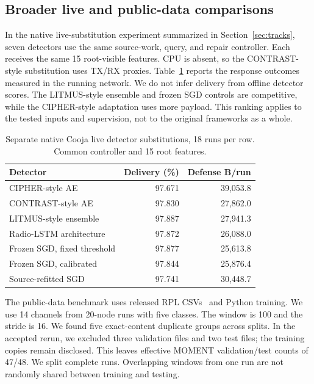 \documentclass[journal]{IEEEtran}
\begin{document}
\subsection{Broader live and public-data comparisons}
In the native live-substitution experiment summarized in Section~\ref{sec:tracks}, seven detectors use the same source-work, query, and repair controller. Each receives the same 15 root-visible features. CPU is absent, so the CONTRAST-style substitution uses TX/RX proxies. Table~\ref{tab:live} reports the response outcomes measured in the running network. We do not infer delivery from offline detector scores. The LITMUS-style ensemble and frozen SGD controls are competitive, while the CIPHER-style adaptation uses more payload. This ranking applies to the tested inputs and supervision, not to the original frameworks as a whole.

\begin{table}[t]\caption{Separate native Cooja live detector substitutions, 18 runs per row. Common controller and 15 root features.}
\label{tab:live}\centering\small
\begin{tabular}{lrr}\toprule Detector & Delivery (\%) & Defense B/run\\\midrule
CIPHER-style AE&97.671&39,053.8\\
CONTRAST-style AE&97.830&27,862.0\\
LITMUS-style ensemble&97.887&27,941.3\\
Radio-LSTM architecture&97.872&26,088.0\\
Frozen SGD, fixed threshold&97.877&25,613.8\\
Frozen SGD, calibrated&97.844&25,876.4\\
Source-refitted SGD&97.741&30,448.7\\\bottomrule
\end{tabular}\end{table}

The public-data benchmark uses released RPL CSVs~\cite{radiocode} and Python training. We use 14 channels from 20-node runs with five classes. The window is 100 and the stride is 16. We found five exact-content duplicate groups across splits. In the accepted rerun, we excluded three validation files and two test files; the training copies remain disclosed. This leaves effective MOMENT validation/test counts of 47/48. We split complete runs. Overlapping windows from one run are not randomly shared between training and testing.
\end{document}
